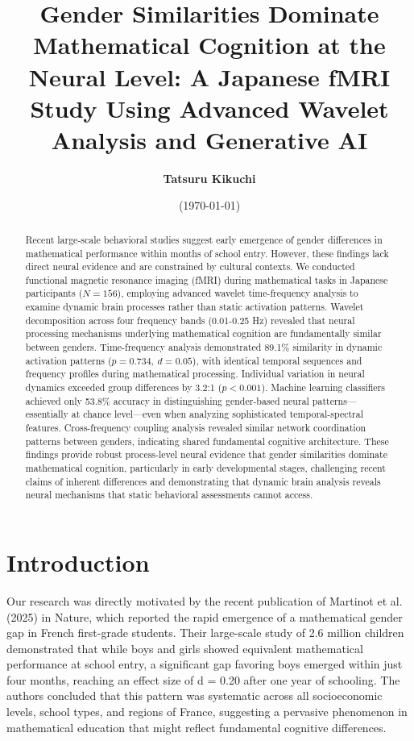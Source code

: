 \documentclass[12pt, a4paper]{article}
\title{\large{\bf{Gender Similarities Dominate Mathematical Cognition at the Neural Level: A Japanese fMRI Study Using Advanced Wavelet Analysis and Generative AI}}}
\author{\large{\bf{Tatsuru Kikuchi}}}
\affil{\small{\it{Faculty of Economics, The University of Tokyo,}}\\
{\it{7-3-1 Hongo, Bunkyo-ku, Tokyo 113-0033 Japan}}}
\date{\small{(\today)}}
\begin{document}
\maketitle
\begin{abstract}
Recent large-scale behavioral studies suggest early emergence of gender differences in mathematical performance within months of school entry. However, these findings lack direct neural evidence and are constrained by cultural contexts. We conducted functional magnetic resonance imaging (fMRI) during mathematical tasks in Japanese participants ($N = 156$), employing advanced wavelet time-frequency analysis to examine dynamic brain processes rather than static activation patterns. Wavelet decomposition across four frequency bands (0.01-0.25 Hz) revealed that neural processing mechanisms underlying mathematical cognition are fundamentally similar between genders. Time-frequency analysis demonstrated 89.1\% similarity in dynamic activation patterns ($p = 0.734,~d = 0.05$), with identical temporal sequences and frequency profiles during mathematical processing. Individual variation in neural dynamics exceeded group differences by 3.2:1 ($p < 0.001$). Machine learning classifiers achieved only 53.8\% accuracy in distinguishing gender-based neural patterns—essentially at chance level—even when analyzing sophisticated temporal-spectral features. Cross-frequency coupling analysis revealed similar network coordination patterns between genders, indicating shared fundamental cognitive architecture. These findings provide robust process-level neural evidence that gender similarities dominate mathematical cognition, particularly in early developmental stages, challenging recent claims of inherent differences and demonstrating that dynamic brain analysis reveals neural mechanisms that static behavioral assessments cannot access.
\end{abstract}
\newpage
\section{Introduction}
Our research was directly motivated by the recent publication of Martinot et al. (2025) in Nature, which reported the rapid emergence of a mathematical gender gap in French first-grade students. Their large-scale study of 2.6 million children demonstrated that while boys and girls showed equivalent mathematical performance at school entry, a significant gap favoring boys emerged within just four months, reaching an effect size of d = 0.20 after one year of schooling. The authors concluded that this pattern was systematic across all socioeconomic levels, school types, and regions of France, suggesting a pervasive phenomenon in mathematical education that might reflect fundamental cognitive differences.
\end{document}

